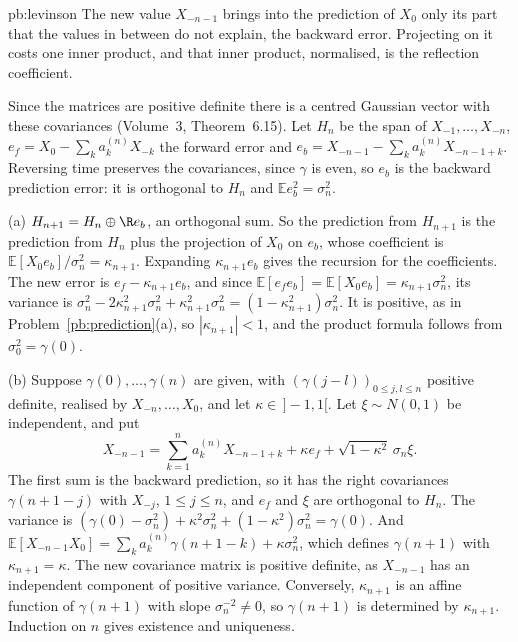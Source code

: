 \begin{solution}{pb:levinson}
\idea The new value $X_{-n-1}$ brings into the prediction of $X_0$ only its part that the values in between do not explain, the backward error. Projecting on it costs one inner product, and that
inner product, normalised, is the reflection coefficient.

\writeup Since the matrices are positive definite there is a centred Gaussian vector with these covariances (Volume~3, Theorem~6.15). Let $H_n$ be the span of $X_{-1},\dots,X_{-n}$, $e_f=X_0-\sum_ka^{(n)}_kX_{-k}$
the forward error and $e_b=X_{-n-1}-\sum_ka^{(n)}_kX_{-n-1+k}$. Reversing time preserves the covariances, since $\gamma$ is even, so $e_b$ is the backward prediction error: it is orthogonal to
$H_n$ and $\mathbb E e_b^2=\sigma_n^2$.

(a) $H_{n+1}=H_n\oplus\R e_b$, an orthogonal sum. So the prediction from $H_{n+1}$ is the prediction from $H_n$ plus the projection of $X_0$ on $e_b$, whose coefficient is
$\mathbb E[X_0e_b]/\sigma_n^2=\kappa_{n+1}$. Expanding $\kappa_{n+1}e_b$ gives the recursion for the coefficients. The new error is $e_f-\kappa_{n+1}e_b$, and since
$\mathbb E[e_fe_b]=\mathbb E[X_0e_b]=\kappa_{n+1}\sigma_n^2$, its variance is $\sigma_n^2-2\kappa_{n+1}^2\sigma_n^2+\kappa_{n+1}^2\sigma_n^2=(1-\kappa_{n+1}^2)\sigma_n^2$. It is positive, as in
Problem~\ref{pb:prediction}(a), so $|\kappa_{n+1}|<1$, and the product formula follows from $\sigma_0^2=\gamma(0)$.

(b) Suppose $\gamma(0),\dots,\gamma(n)$ are given, with $(\gamma(j-l))_{0\le j,l\le n}$ positive definite, realised by $X_{-n},\dots,X_0$, and let $\kappa\in\,]-1,1[$. Let $\xi\sim N(0,1)$ be independent, and put
\[
X_{-n-1}=\sum_{k=1}^na^{(n)}_kX_{-n-1+k}+\kappa e_f+\sqrt{1-\kappa^2}\,\sigma_n\xi.
\]
The first sum is the backward prediction, so it has the right covariances $\gamma(n+1-j)$ with $X_{-j}$, $1\le j\le n$, and $e_f$ and $\xi$ are orthogonal to $H_n$. The variance is
$(\gamma(0)-\sigma_n^2)+\kappa^2\sigma_n^2+(1-\kappa^2)\sigma_n^2=\gamma(0)$. And $\mathbb E[X_{-n-1}X_0]=\sum_ka^{(n)}_k\gamma(n+1-k)+\kappa\sigma_n^2$, which defines $\gamma(n+1)$ with $\kappa_{n+1}=\kappa$. The
new covariance matrix is positive definite, as $X_{-n-1}$ has an independent component of positive variance. Conversely, $\kappa_{n+1}$ is an affine function of $\gamma(n+1)$ with slope $\sigma_n^{-2}\ne0$,
so $\gamma(n+1)$ is determined by $\kappa_{n+1}$. Induction on $n$ gives existence and uniqueness.


\end{solution}
